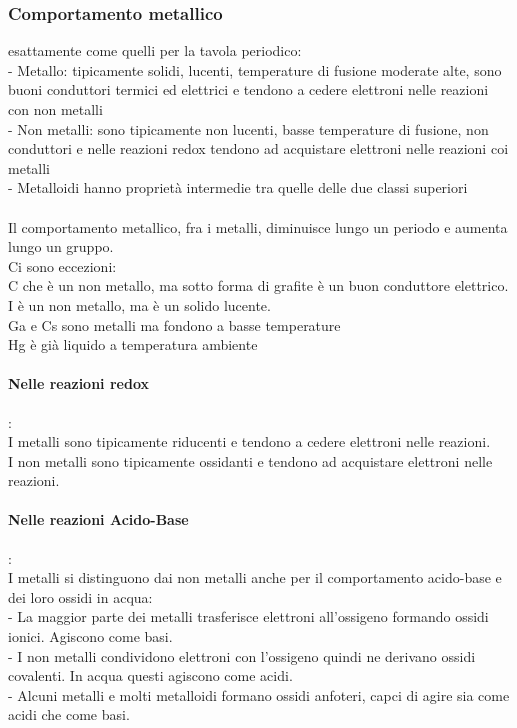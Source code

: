 \subsubsection{Comportamento metallico}
esattamente come quelli per la tavola periodico:\\
\tab- Metallo: tipicamente solidi, lucenti, temperature di fusione moderate alte, sono buoni conduttori termici ed elettrici e tendono a cedere elettroni nelle reazioni con non metalli\\
\tab- Non metalli: sono tipicamente non lucenti, basse temperature di fusione, non conduttori e nelle reazioni redox tendono ad acquistare elettroni nelle reazioni coi metalli\\
\tab- Metalloidi hanno proprietà intermedie tra quelle delle due classi superiori\\\\
Il comportamento metallico, fra i metalli, diminuisce lungo un periodo e aumenta lungo un gruppo. \\
Ci sono eccezioni: \\
C che è un non metallo, ma sotto forma di grafite è un buon conduttore elettrico. \\
I è un non metallo, ma è un solido lucente.\\
Ga e Cs sono metalli ma fondono a basse temperature\\
Hg è già liquido a temperatura ambiente\\
\paragraph*{Nelle reazioni redox}:\\
I metalli sono tipicamente riducenti e tendono a cedere elettroni nelle reazioni.\\
I non metalli sono tipicamente ossidanti e tendono ad acquistare elettroni nelle reazioni.\\
\paragraph*{Nelle reazioni Acido-Base}:\\
I metalli si distinguono dai non metalli anche per il comportamento acido-base e dei loro ossidi in acqua:\\
\tab- La maggior parte dei metalli trasferisce elettroni all'ossigeno formando ossidi ionici. Agiscono come basi.\\
\tab- I non metalli condividono elettroni con l'ossigeno quindi ne derivano ossidi covalenti. In acqua questi agiscono come acidi.\\
\tab- Alcuni metalli e molti metalloidi formano ossidi anfoteri, capci di agire sia come acidi che come basi.\\
